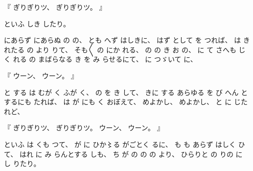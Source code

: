 %
『
ぎりぎりツ、
%
ぎりぎりツ。
』

%
といふ
しき%
したり。%

%
にあらず
にあらぬ
の
の、
%
とも
へず
はしきに、
%
はず
として
を%
つれば、
%
は
き
れたる
の
より%
りて、
%
そも〳〵
の
にか
れる、
%
の
の
き
お
の、%
%
%
に
て
さへも
じく
れる
の
まばらなる
き
を
み
らせるにて、
%
に
つゞいて%
に、

%
『
ウーン、
%
ウーン。
』

%
と
する
は
むが
く
ふが
く、
%
の
を
き
して、
%
きに
する
あらゆる
を
び
へん
とするにも
たれば、
%
は
が
にも
く
おぼえて、
%
めよかし、
%
めよかし、
%
と
に
じたれど、

%
『
ぎりぎりツ、
%
ぎりぎりツ。
%
ウーン、
%
ウーン。
』

%
といふ
は
くも
つて、
%
が
に
ひか〻る%
がごとく
るに、
%
も
も
あらず
はしく
ひて、
%
はれ
に%
み
らんとする
しも、
%
ち
が
の
の
の
より、
%
ひらりと
の
りの
に
し
りたり。
